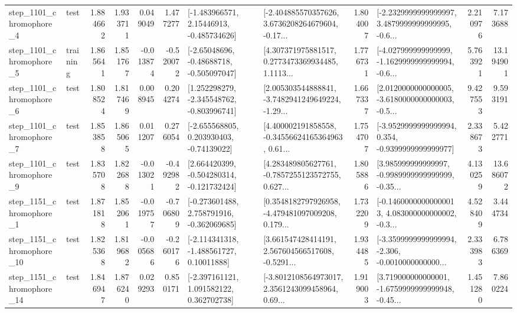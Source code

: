 \begin{tabular}{llrrrrllrlrr}
  step\_1101\_chromophore\_4 &      test &      1.884662 &    1.933711 &      0.049049 &  1.477277 &    [-1.483966571, 2.15446913, -0.485734626] &  [-2.404885570357626, 3.6736208264679604, -0.17... &       1.804007 &  [-2.2329999999999997, 3.4879999999999995, -0.6... &            2.210976 &          7.173688 \\
  step\_1101\_chromophore\_5 &  training &      1.865641 &    1.851767 &     -0.013874 & -0.520072 &    [-2.65048696, -0.48688718, -0.505097047] &  [4.307371975881517, 0.2773473369934485, 1.1113... &       1.776731 &  [-4.027999999999999, -1.1629999999999994, -0.6... &            5.763921 &         13.194901 \\
  step\_1101\_chromophore\_6 &      test &      1.808524 &    1.817469 &      0.008945 &  0.204274 &   [1.252298279, -2.345548762, -0.803996741] &  [2.005303544888841, -3.7482941249649224, -1.29... &       1.667337 &  [2.0120000000000005, -3.6180000000000003, -0.5... &            9.427553 &          9.593191 \\
  step\_1101\_chromophore\_7 &      test &      1.853858 &    1.865065 &      0.011207 &  0.276054 &    [-2.655568805, 0.203930403, -0.74139022] &  [4.400002191858558, -0.34556624165364963, 0.61... &       1.754707 &  [-3.9529999999999994, 0.354, -0.9399999999999977] &            2.338673 &          5.422771 \\
  step\_1101\_chromophore\_9 &      test &      1.835708 &    1.822688 &     -0.013021 & -0.492982 &   [2.664420399, -0.504280314, -0.121732424] &  [4.283489805627761, -0.7857255123572755, 0.627... &       1.805886 &  [3.985999999999997, -0.9989999999999999, -0.35... &            4.130259 &         13.686072 \\
  step\_1151\_chromophore\_1 &      test &      1.871818 &    1.852061 &     -0.019757 & -0.706809 &   [-0.273601488, 2.758791916, -0.362069685] &  [0.3548182797926958, -4.479481097009208, 0.179... &       1.732209 &  [-0.14600000000000013, 4.083000000000002, -0.3... &            4.528409 &          3.444734 \\
 step\_1151\_chromophore\_10 &      test &      1.825368 &    1.819682 &     -0.005686 & -0.260176 &    [-2.114341318, -1.488561727, 0.10011888] &  [3.661547428414191, 2.567604566517608, -0.5291... &       1.934485 &  [-3.3599999999999994, -2.306, -0.0010000000000... &            2.333983 &          6.786369 \\
 step\_1151\_chromophore\_14 &      test &      1.846947 &    1.876240 &      0.029293 &  0.850171 &    [-2.397161121, 1.091582122, 0.362702738] &  [-3.8012108564973017, 2.3561243099458964, 0.69... &       1.919003 &  [3.719000000000001, -1.6759999999999948, -0.45... &            1.451280 &          7.860224 \\

\end{tabular}
